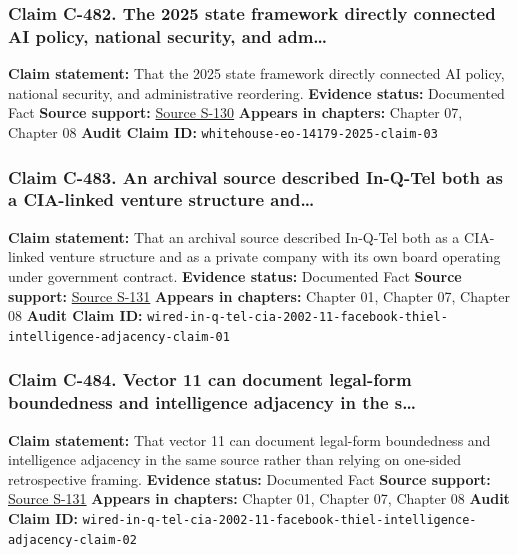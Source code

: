 \documentclass[
  american,
  11pt,
  letterpaper,
]{article}
\begin{document}
\subsubsection{Claim C-482. The 2025 state framework directly connected
AI policy, national security, and
adm\ldots{}}\label{claim-c-482-the-2025-state-framework-directly-connected-ai-policy-national-security-and-adm}

\textbf{Claim statement:} That the 2025 state framework directly
connected AI policy, national security, and administrative reordering.
\textbf{Evidence status:} Documented Fact \textbf{Source support:}
\hyperref[source-s-130-removing-barriers-to-american-leadership-in-artificial-intelligence]{Source
S-130} \textbf{Appears in chapters:} Chapter 07, Chapter 08
\textbf{Audit Claim ID:} \texttt{whitehouse-eo-14179-2025-claim-03}

\subsubsection{Claim C-483. An archival source described In-Q-Tel both
as a CIA-linked venture structure
and\ldots{}}\label{claim-c-483-an-archival-source-described-in-q-tel-both-as-a-cia-linked-venture-structure-and}

\textbf{Claim statement:} That an archival source described In-Q-Tel
both as a CIA-linked venture structure and as a private company with its
own board operating under government contract. \textbf{Evidence status:}
Documented Fact \textbf{Source support:}
\hyperref[source-s-131-it-pays-to-play-with-the-cia]{Source S-131}
\textbf{Appears in chapters:} Chapter 01, Chapter 07, Chapter 08
\textbf{Audit Claim ID:}
\texttt{wired-in-q-tel-cia-2002-11-facebook-thiel-intelligence-adjacency-claim-01}

\subsubsection{Claim C-484. Vector 11 can document legal-form
boundedness and intelligence adjacency in the
s\ldots{}}\label{claim-c-484-vector-11-can-document-legal-form-boundedness-and-intelligence-adjacency-in-the-s}

\textbf{Claim statement:} That vector 11 can document legal-form
boundedness and intelligence adjacency in the same source rather than
relying on one-sided retrospective framing. \textbf{Evidence status:}
Documented Fact \textbf{Source support:}
\hyperref[source-s-131-it-pays-to-play-with-the-cia]{Source S-131}
\textbf{Appears in chapters:} Chapter 01, Chapter 07, Chapter 08
\textbf{Audit Claim ID:}
\texttt{wired-in-q-tel-cia-2002-11-facebook-thiel-intelligence-adjacency-claim-02}
\end{document}
